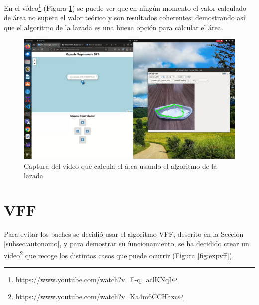 En el vídeo\footnote{\url{https://www.youtube.com/watch?v=E-q_aclKNqI}} (Figura \ref{fig:expcapturalazada}) se puede ver que en ningún momento el valor calculado de área no supera el valor teórico y son resultados coherentes; demostrando así que el algoritmo de la lazada es una buena opción para calcular el área.
 
\begin{figure} [h!]
	\begin{center}
			\includegraphics[width=15cm]{figs/cap7/capturavideolazada.png}
		\end{center}
	\caption{Captura del vídeo que calcula el área usando el algoritmo de la lazada}
	\label{fig:expcapturalazada}
\end{figure}


\section{VFF}
\label{sec:expvff}
Para evitar los baches se decidió usar el algoritmo \ac{VFF}, descrito en la Sección \ref{subsec:autonomo}, y para demostrar su funcionamiento, se ha decidido crear un video\footnote{\url{https://www.youtube.com/watch?v=Ka4m6CCHhxc}} que recoge los distintos casos que puede ocurrir (Figura \ref{fig:expvff}).  

